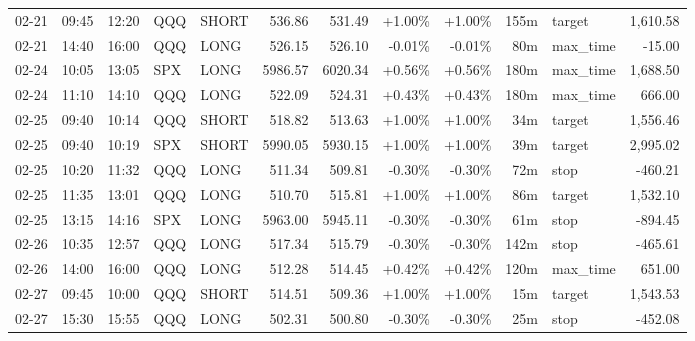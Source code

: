 \documentclass[11pt,a4paper,twoside]{article}
\begin{document}
\begin{center}
\begin{longtable}{>{\color{txtmain}}l l l l l r r r r r >{\color{txtmain}}l r}
02-21 & 09:45 & 12:20 & QQQ & SHORT & 536.86 & 531.49 & \textcolor{wingreen}{+1.00\%} & \textcolor{wingreen}{+1.00\%} & 155m & target & \textcolor{wingreen}{1,610.58} \\
02-21 & 14:40 & 16:00 & QQQ & LONG & 526.15 & 526.10 & \textcolor{lossred}{-0.01\%} & \textcolor{lossred}{-0.01\%} & 80m & max\_time & \textcolor{lossred}{-15.00} \\
02-24 & 10:05 & 13:05 & SPX & LONG & 5986.57 & 6020.34 & \textcolor{wingreen}{+0.56\%} & \textcolor{wingreen}{+0.56\%} & 180m & max\_time & \textcolor{wingreen}{1,688.50} \\
02-24 & 11:10 & 14:10 & QQQ & LONG & 522.09 & 524.31 & \textcolor{wingreen}{+0.43\%} & \textcolor{wingreen}{+0.43\%} & 180m & max\_time & \textcolor{wingreen}{666.00} \\
02-25 & 09:40 & 10:14 & QQQ & SHORT & 518.82 & 513.63 & \textcolor{wingreen}{+1.00\%} & \textcolor{wingreen}{+1.00\%} & 34m & target & \textcolor{wingreen}{1,556.46} \\
02-25 & 09:40 & 10:19 & SPX & SHORT & 5990.05 & 5930.15 & \textcolor{wingreen}{+1.00\%} & \textcolor{wingreen}{+1.00\%} & 39m & target & \textcolor{wingreen}{2,995.02} \\
02-25 & 10:20 & 11:32 & QQQ & LONG & 511.34 & 509.81 & \textcolor{lossred}{-0.30\%} & \textcolor{lossred}{-0.30\%} & 72m & stop & \textcolor{lossred}{-460.21} \\
02-25 & 11:35 & 13:01 & QQQ & LONG & 510.70 & 515.81 & \textcolor{wingreen}{+1.00\%} & \textcolor{wingreen}{+1.00\%} & 86m & target & \textcolor{wingreen}{1,532.10} \\
02-25 & 13:15 & 14:16 & SPX & LONG & 5963.00 & 5945.11 & \textcolor{lossred}{-0.30\%} & \textcolor{lossred}{-0.30\%} & 61m & stop & \textcolor{lossred}{-894.45} \\
02-26 & 10:35 & 12:57 & QQQ & LONG & 517.34 & 515.79 & \textcolor{lossred}{-0.30\%} & \textcolor{lossred}{-0.30\%} & 142m & stop & \textcolor{lossred}{-465.61} \\
02-26 & 14:00 & 16:00 & QQQ & LONG & 512.28 & 514.45 & \textcolor{wingreen}{+0.42\%} & \textcolor{wingreen}{+0.42\%} & 120m & max\_time & \textcolor{wingreen}{651.00} \\
02-27 & 09:45 & 10:00 & QQQ & SHORT & 514.51 & 509.36 & \textcolor{wingreen}{+1.00\%} & \textcolor{wingreen}{+1.00\%} & 15m & target & \textcolor{wingreen}{1,543.53} \\
02-27 & 15:30 & 15:55 & QQQ & LONG & 502.31 & 500.80 & \textcolor{lossred}{-0.30\%} & \textcolor{lossred}{-0.30\%} & 25m & stop & \textcolor{lossred}{-452.08} \\

\end{longtable}
\end{center}
\end{document}

